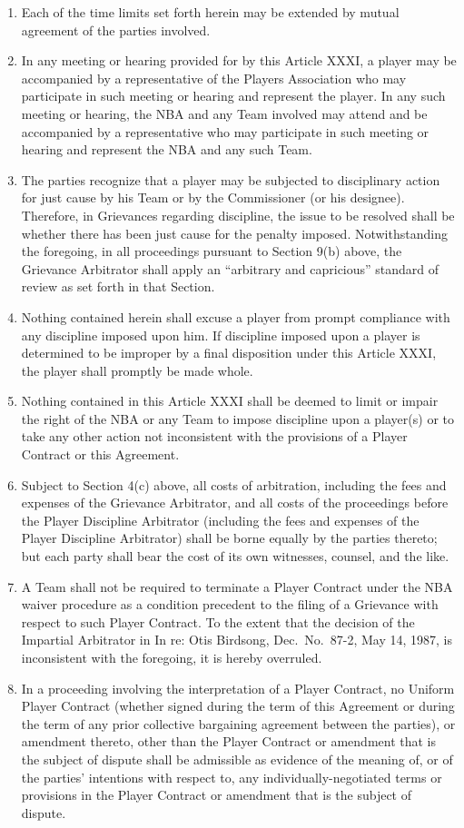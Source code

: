 \documentclass[
]{book}
\providecommand{\tightlist}{%
  \setlength{\itemsep}{0pt}\setlength{\parskip}{0pt}}
\begin{document}
\begin{enumerate}
\def\labelenumi{(\alph{enumi})}
\tightlist
\item
  Each of the time limits set forth herein may be extended by mutual agreement of the parties involved.
\item
  In any meeting or hearing provided for by this Article XXXI, a player may be accompanied by a representative of the Players Association who may participate in such meeting or hearing and represent the player. In any such meeting or hearing, the NBA and any Team involved may attend and be accompanied by a representative who may participate in such meeting or hearing and represent the NBA and any such Team.
\item
  The parties recognize that a player may be subjected to disciplinary action for just cause by his Team or by the Commissioner (or his designee). Therefore, in Grievances regarding discipline, the issue to be resolved shall be whether there has been just cause for the penalty imposed. Notwithstanding the foregoing, in all proceedings pursuant to Section 9(b) above, the Grievance Arbitrator shall apply an ``arbitrary and capricious'' standard of review as set forth in that Section.
\item
  Nothing contained herein shall excuse a player from prompt compliance with any discipline imposed upon him. If discipline imposed upon a player is determined to be improper by a final disposition under this Article XXXI, the player shall promptly be made whole.
\item
  Nothing contained in this Article XXXI shall be deemed to limit or impair the right of the NBA or any Team to impose discipline upon a player(s) or to take any other action not inconsistent with the provisions of a Player Contract or this Agreement.
\item
  Subject to Section 4(c) above, all costs of arbitration, including the fees and expenses of the Grievance Arbitrator, and all costs of the proceedings before the Player Discipline Arbitrator (including the fees and expenses of the Player Discipline Arbitrator) shall be borne equally by the parties thereto; but each party shall bear the cost of its own witnesses, counsel, and the like.
\item
  A Team shall not be required to terminate a Player Contract under the NBA waiver procedure as a condition precedent to the filing of a Grievance with respect to such Player Contract. To the extent that the decision of the Impartial Arbitrator in In re: Otis Birdsong, Dec.~No.~87-2, May 14, 1987, is inconsistent with the foregoing, it is hereby overruled.
\item
  In a proceeding involving the interpretation of a Player Contract, no Uniform Player Contract (whether signed during the term of this Agreement or during the term of any prior collective bargaining agreement between the parties), or amendment thereto, other than the Player Contract or amendment that is the subject of dispute shall be admissible as evidence of the meaning of, or of the parties' intentions with respect to, any individually-negotiated terms or provisions in the Player Contract or amendment that is the subject of dispute.
\end{enumerate}
\end{document}
